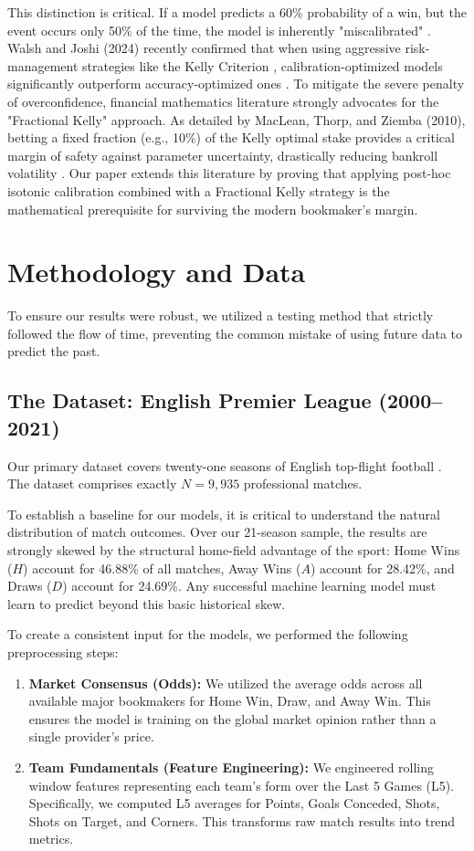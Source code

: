 \documentclass[pdflatex,sn-basic]{sn-jnl}
\begin{document}
This distinction is critical. If a model predicts a 60\% probability of a win, but the event occurs only 50\% of the time, the model is inherently "miscalibrated" \cite{guo2017}. Walsh and Joshi (2024) recently confirmed that when using aggressive risk-management strategies like the Kelly Criterion \cite{kelly1956}, calibration-optimized models significantly outperform accuracy-optimized ones \cite{walsh2024}. To mitigate the severe penalty of overconfidence, financial mathematics literature strongly advocates for the "Fractional Kelly" approach. As detailed by MacLean, Thorp, and Ziemba (2010), betting a fixed fraction (e.g., 10\%) of the Kelly optimal stake provides a critical margin of safety against parameter uncertainty, drastically reducing bankroll volatility \cite{maclean2010}. Our paper extends this literature by proving that applying post-hoc isotonic calibration combined with a Fractional Kelly strategy is the mathematical prerequisite for surviving the modern bookmaker's margin.


\section{Methodology and Data}

To ensure our results were robust, we utilized a testing method that strictly followed the flow of time, preventing the common mistake of using future data to predict the past.

\subsection{The Dataset: English Premier League (2000–2021)}
Our primary dataset covers twenty-one seasons of English top-flight football \cite{kaggleEPL}. The dataset comprises exactly $N = 9,935$ professional matches.

To establish a baseline for our models, it is critical to understand the natural distribution of match outcomes. Over our 21-season sample, the results are strongly skewed by the structural home-field advantage of the sport: Home Wins ($H$) account for 46.88\% of all matches, Away Wins ($A$) account for 28.42\%, and Draws ($D$) account for 24.69\%. Any successful machine learning model must learn to predict beyond this basic historical skew.

To create a consistent input for the models, we performed the following preprocessing steps:
\begin{enumerate}
    \item \textbf{Market Consensus (Odds):} We utilized the average odds across all available major bookmakers for Home Win, Draw, and Away Win. This ensures the model is training on the global market opinion rather than a single provider's price.
    \item \textbf{Team Fundamentals (Feature Engineering):} We engineered rolling window features representing each team's form over the Last 5 Games (L5). Specifically, we computed L5 averages for Points, Goals Conceded, Shots, Shots on Target, and Corners. This transforms raw match results into trend metrics.
\end{enumerate}
\end{document}
